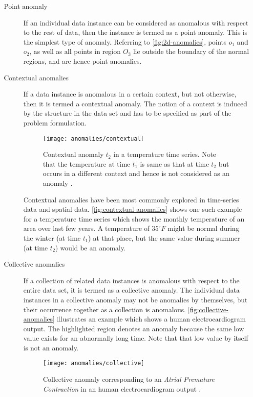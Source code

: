 \begin{description}

\item[Point anomaly] If an individual data instance can be considered as
anomalous with respect to the rest of data, then the instance is termed as a
point anomaly. This is the simplest type of anomaly. Referring to
\autoref{fig:2d-anomalies}, points $o_{1}$ and $o_{2}$, as well as all points in
region $O_{3}$ lie outside the boundary of the normal regions, and are hence
point anomalies.

\item[Contextual anomalies] If a data instance is anomalous in a certain
context, but not otherwise, then it is termed a contextual anomaly. The notion
of a context is induced by the structure in the data set and has to be specified
as part of the problem formulation.

\begin{figure}
    \centering
    \texttt{[image: anomalies/contextual]}
    \caption[Contextual anomaly $t_{2}$ in a temperature time series.]
        {Contextual anomaly $t_{2}$ in a temperature time series. Note that the
        temperature at time $t_{1}$ is same as that at time $t_{2}$ but occurs
        in a different context and hence is not considered as an anomaly
        \cite{Chandola:2007}.}
    \label{fig:contextual-anomalies}
\end{figure}

Contextual anomalies have been most commonly explored in time-series data and
spatial data. \autoref{fig:contextual-anomalies} shows one such example for a
temperature time series which shows the monthly temperature of an area over last
few years. A temperature of $35^\circ F$ might be normal during the winter
(at time $t_{1}$) at that place, but the same value during summer (at time
$t_{2}$) would be an anomaly.

\item[Collective anomalies] If a collection of related data instances is
anomalous with respect to the entire data set, it is termed as a collective
anomaly. The individual data instances in a collective anomaly may not be
anomalies by themselves, but their occurrence together as a collection is
anomalous. \autoref{fig:collective-anomalies} illustrates an example which shows
a human electrocardiogram output. The highlighted region denotes an anomaly
because the same low value exists for an abnormally long time. Note that that
low value by itself is not an anomaly.

\begin{figure}
    \centering
    \texttt{[image: anomalies/collective]}
    \caption[Collective anomaly corresponding to an \emph{Atrial Premature
        Contraction} in an human electrocardiogram output.]
        {Collective anomaly corresponding to an \emph{Atrial Premature
        Contraction} in an human electrocardiogram output 
        \cite{Goldberger:2000}.}
    \label{fig:collective-anomalies}
\end{figure}

\end{description}


